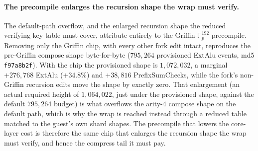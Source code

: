
\paragraph{The precompile enlarges the recursion shape the wrap must verify.}
The default-path overflow, and the enlarged recursion shape the reduced verifying-key table must cover, attribute entirely to the Griffin-$\mathbb{F}_p^{192}$ precompile. Removing only the Griffin chip, with every other fork edit intact, reproduces the pre-Griffin compose shape byte-for-byte ($795{,}264$ provisioned ExtAlu events, md5 \texttt{f97a8b2f}). With the chip the provisioned shape is $1{,}072{,}032$, a marginal $+276{,}768$ ExtAlu ($+34.8\%$) and $+38{,}816$ PrefixSumChecks, while the fork's non-Griffin recursion edits move the shape by exactly zero. That enlargement (an actual required height of $1{,}064{,}022$, just under the provisioned shape, against the default $795{,}264$ budget) is what overflows the arity-$4$ compose shape on the default path, which is why the wrap is reached instead through a reduced table matched to the guest's own shard shapes. The precompile that lowers the core-layer cost is therefore the same chip that enlarges the recursion shape the wrap must verify, and hence the compress tail it must pay.

